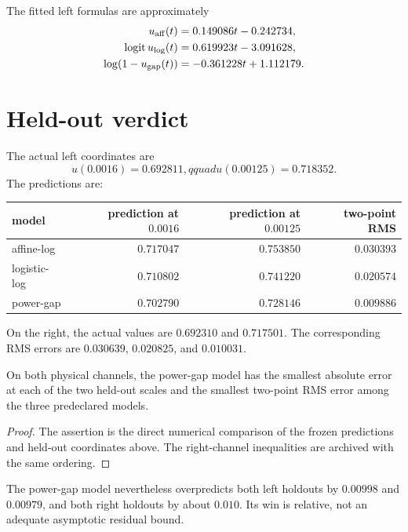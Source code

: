 \documentclass[12pt]{article}
\theoremstyle{remark}\newtheorem{remark}[theorem]{Remark}
\begin{document}
The fitted left formulas are approximately
\begin{align}
 u_{\rm aff}(t)&=0.149086t-0.242734,\\
 \operatorname{logit}u_{\rm log}(t)&=0.619923t-3.091628,\\
 \log(1-u_{\rm gap}(t))&=-0.361228t+1.112179.
\end{align}

\section{Held-out verdict}

The actual left coordinates are
\begin{equation}
 u(0.0016)=0.692811,qquad u(0.00125)=0.718352.
\end{equation}
The predictions are:
\begin{center}
\begin{tabular}{lrrr}
\toprule
model & prediction at $0.0016$ & prediction at $0.00125$ & two-point RMS\\
\midrule
affine-log & $0.717047$ & $0.753850$ & $0.030393$\\
logistic-log & $0.710802$ & $0.741220$ & $0.020574$\\
power-gap & $0.702790$ & $0.728146$ & $0.009886$\\
\bottomrule
\end{tabular}
\end{center}

On the right, the actual values are $0.692310$ and $0.717501$.  The
corresponding RMS errors are $0.030639$, $0.020825$, and $0.010031$.

\begin{proposition}\label{prop:winner}
On both physical channels, the power-gap model has the smallest absolute
error at each of the two held-out scales and the smallest two-point RMS
error among the three predeclared models.
\end{proposition}
\begin{proof}
The assertion is the direct numerical comparison of the frozen predictions
and held-out coordinates above.  The right-channel inequalities are archived
with the same ordering.
\end{proof}

The power-gap model nevertheless overpredicts both left holdouts by
$0.00998$ and $0.00979$, and both right holdouts by about $0.010$.  Its win is
relative, not an adequate asymptotic residual bound.
\end{document}

